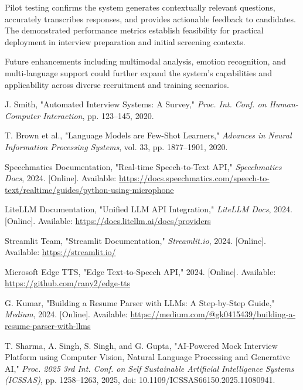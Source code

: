 \documentclass[conference]{IEEEtran}
\begin{document}
Pilot testing confirms the system generates contextually relevant questions, accurately transcribes responses, and provides actionable feedback to candidates. The demonstrated performance metrics establish feasibility for practical deployment in interview preparation and initial screening contexts.

Future enhancements including multimodal analysis, emotion recognition, and multi-language support could further expand the system's capabilities and applicability across diverse recruitment and training scenarios.

\balance
\begin{thebibliography}{1}

J. Smith, "Automated Interview Systems: A Survey," \textit{Proc. Int. Conf. on Human-Computer Interaction}, pp. 123--145, 2020.

T. Brown et al., "Language Models are Few-Shot Learners," \textit{Advances in Neural Information Processing Systems}, vol. 33, pp. 1877--1901, 2020.

Speechmatics Documentation, "Real-time Speech-to-Text API," \textit{Speechmatics Docs}, 2024. [Online]. Available: \url{https://docs.speechmatics.com/speech-to-text/realtime/guides/python-using-microphone}

LiteLLM Documentation, "Unified LLM API Integration," \textit{LiteLLM Docs}, 2024. [Online]. Available: \url{https://docs.litellm.ai/docs/providers}

Streamlit Team, "Streamlit Documentation," \textit{Streamlit.io}, 2024. [Online]. Available: \url{https://streamlit.io/}

Microsoft Edge TTS, "Edge Text-to-Speech API," 2024. [Online]. Available: \url{https://github.com/rany2/edge-tts}

G. Kumar, "Building a Resume Parser with LLMs: A Step-by-Step Guide," \textit{Medium}, 2024. [Online]. Available: \url{https://medium.com/@gk0415439/building-a-resume-parser-with-llms}

T. Sharma, A. Singh, S. Singh, and G. Gupta, "AI-Powered Mock Interview Platform using Computer Vision, Natural Language Processing and Generative AI," \textit{Proc. 2025 3rd Int. Conf. on Self Sustainable Artificial Intelligence Systems (ICSSAS)}, pp. 1258--1263, 2025, doi: 10.1109/ICSSAS66150.2025.11080941.


\end{thebibliography}
\end{document}
